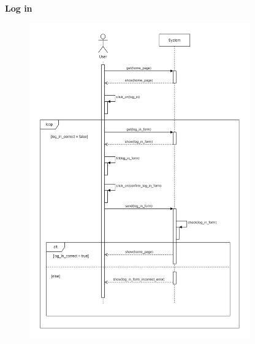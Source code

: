 \documentclass[../RASD.tex]{subfiles}
\begin{document}
    \textbf{Log in}
    \begin{figure}[h!]
        \centering
        \includegraphics[width=0.85\textwidth]{../assets/section_3/LoginDiagram.png}
    \end{figure}
    \newpage
\end{document}
